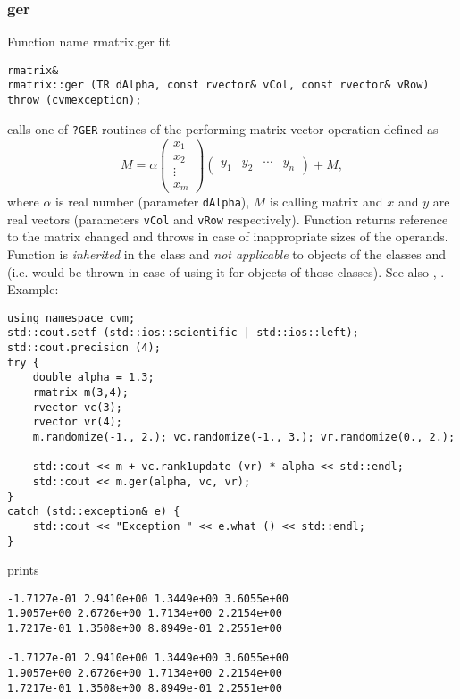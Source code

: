 \subsubsection{ger}
Function%
\pdfdest name {rmatrix.ger} fit
\begin{verbatim}
rmatrix&
rmatrix::ger (TR dAlpha, const rvector& vCol, const rvector& vRow)
throw (cvmexception);
\end{verbatim}
calls one of \verb"?GER" routines of the
performing  
matrix-vector operation defined as
\begin{equation*}
M=\alpha\begin{pmatrix}
x_1 \\
x_2 \\
\vdots \\
x_m
\end{pmatrix}
\begin{pmatrix}
y_1 & y_2 & \cdots & y_n
\end{pmatrix} + M,
\end{equation*}
where $\alpha$ is  real number
(parameter \verb"dAlpha"),
$M$ is  calling matrix
and $x$ and $y$ are real vectors (parameters \verb"vCol"
and \verb"vRow" respectively).
Function
returns  reference to the matrix changed and throws
in case of inappropriate sizes of the operands.
Function is \emph{inherited} in the class
 and
\emph{not applicable} to objects of the classes
 and
 (i.e.  would be thrown
in case of using it for objects of those classes).
See also
,
.
Example:
\begin{Verbatim}
using namespace cvm;
std::cout.setf (std::ios::scientific | std::ios::left);
std::cout.precision (4);
try {
    double alpha = 1.3;
    rmatrix m(3,4);
    rvector vc(3);
    rvector vr(4);
    m.randomize(-1., 2.); vc.randomize(-1., 3.); vr.randomize(0., 2.);

    std::cout << m + vc.rank1update (vr) * alpha << std::endl;
    std::cout << m.ger(alpha, vc, vr);
}
catch (std::exception& e) {
    std::cout << "Exception " << e.what () << std::endl;
}
\end{Verbatim}
prints
\begin{Verbatim}
-1.7127e-01 2.9410e+00 1.3449e+00 3.6055e+00
1.9057e+00 2.6726e+00 1.7134e+00 2.2154e+00
1.7217e-01 1.3508e+00 8.8949e-01 2.2551e+00

-1.7127e-01 2.9410e+00 1.3449e+00 3.6055e+00
1.9057e+00 2.6726e+00 1.7134e+00 2.2154e+00
1.7217e-01 1.3508e+00 8.8949e-01 2.2551e+00
\end{Verbatim}
\newpage



